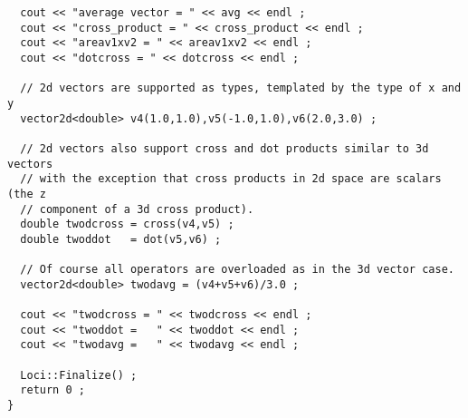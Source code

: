 \begin{verbatim}
  cout << "average vector = " << avg << endl ;
  cout << "cross_product = " << cross_product << endl ;
  cout << "areav1xv2 = " << areav1xv2 << endl ;
  cout << "dotcross = " << dotcross << endl ;
  
  // 2d vectors are supported as types, templated by the type of x and y
  vector2d<double> v4(1.0,1.0),v5(-1.0,1.0),v6(2.0,3.0) ;

  // 2d vectors also support cross and dot products similar to 3d vectors
  // with the exception that cross products in 2d space are scalars (the z
  // component of a 3d cross product).
  double twodcross = cross(v4,v5) ;
  double twoddot   = dot(v5,v6) ;

  // Of course all operators are overloaded as in the 3d vector case.
  vector2d<double> twodavg = (v4+v5+v6)/3.0 ;

  cout << "twodcross = " << twodcross << endl ;
  cout << "twoddot =   " << twoddot << endl ;
  cout << "twodavg =   " << twodavg << endl ;

  Loci::Finalize() ;
  return 0 ;
}
\end{verbatim}
